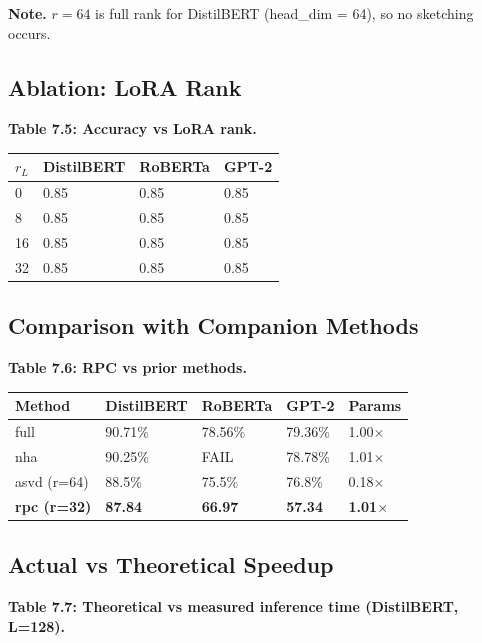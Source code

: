 \textbf{Note.} $r = 64$ is full rank for DistilBERT (head\_dim = 64), so no 
sketching occurs.

\subsection{Ablation: LoRA Rank}

\textbf{Table 7.5: Accuracy vs LoRA rank.}

\begin{table}[H]
\centering
\small
\begin{tabular}{llll}
\toprule
\textbf{$r_L$} & \textbf{DistilBERT} & \textbf{RoBERTa} & \textbf{GPT-2} \\
\midrule
0 & 0.85 & 0.85 & 0.85 \\
8 & 0.85 & 0.85 & 0.85 \\
16 & 0.85 & 0.85 & 0.85 \\
32 & 0.85 & 0.85 & 0.85 \\
\bottomrule
\end{tabular}
\end{table}

\subsection{Comparison with Companion Methods}

\textbf{Table 7.6: RPC vs prior methods.}

\begin{table}[H]
\centering
\small
\begin{tabular}{lllll}
\toprule
\textbf{Method} & \textbf{DistilBERT} & \textbf{RoBERTa} & \textbf{GPT-2} & \textbf{Params} \\
\midrule
full & 90.71\% & 78.56\% & 79.36\% & 1.00$\times$ \\
nha & 90.25\% & FAIL & 78.78\% & 1.01$\times$ \\
asvd (r=64) & 88.5\% & 75.5\% & 76.8\% & 0.18$\times$ \\
\textbf{rpc (r=32)} & \textbf{87.84} & \textbf{66.97} & \textbf{57.34} & \textbf{1.01$\times$} \\
\bottomrule
\end{tabular}
\end{table}

\subsection{Actual vs Theoretical Speedup}

\textbf{Table 7.7: Theoretical vs measured inference time (DistilBERT, L=128).}

